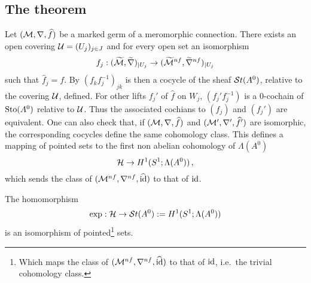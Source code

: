 \subsection{The theorem}
\begin{comment}
  \TODO[See \cite{thboalch} for sheaf-less definition]
\end{comment}
Let $(\mathcal{M},\nabla,\widehat f)$ be a marked germ of a  meromorphic connection.
There exists an open covering $\mathcal{U}=(U_j)_{j\in J}$ and for every open set an
isomorphism
\[
  f_j:(\widetilde{\mathcal{M}},\widetilde\nabla)_{|U_j}
  \to(\widetilde{\mathcal{M}}^{nf},\widetilde\nabla^{nf})_{|U_j}
\]
such that $\hat f_j=f$. By $(f_kf_j^{-1})_{jk}$ is then a cocycle of the
sheaf $\mathcal{S}{}t(A^0)$, relative to the covering $\mathcal{U}$, defined.
For other lifts $f_j'$ of $\hat f$ on $W_j$, $(f_j'f_j^{-1})$ is a $0$-cochain
of $\operatorname{Sto}(A^0)$ relative to $\mathcal{U}$. Thus the associated cochians to $(f_j)$ and
$(f_j')$ are equivalent. One can also check that, if $(\mathcal{M},\nabla,\widehat f)$ and
$(\mathcal{M}',\nabla',\widehat f')$ are isomorphic, the corresponding cocycles define the
same cohomology class. This defines a mapping of pointed sets
to the first non abelian cohomology of $\Lambda(A^0)$
\[
  \mathcal{H}\to H^1(S^1;\Lambda(A^0)) \,,
\]
which sends the class of $(\mathcal{M}^{nf},\nabla^{nf},\widehat{\operatorname{id}})$ to that of
$\operatorname{id}$.

\begin{tthm} \label{thm:mainThm1}
  The homomorphism
  \[
    \exp:\mathcal{H}\to\mathcal{S}{}t(A^0):=H^1(S^1;\Lambda(A^0))
  \]
  is an isomorphism of pointed\footnote{Which maps the class of
  $(\mathcal{M}^{nf},\nabla^{nf},\widehat{\operatorname{id}})$ to that of $\operatorname{id}$, i.e.\ the trivial
  cohomology class.} sets.
\end{tthm}
\begin{comment}
  \begin{rem}
    \marginnote{\cite{Loday1994} Remark I.2.2}
    To another normal form $A^1={}^\Phi\!A^0$ there correspond cochains which
    are conjugated via $\Phi$.
    We get the following commutative diagram:
    \[ \begin{tikzcd}
        G\backslash\hat G(A^1) \rar{\cdot\Phi}\dar{\exp}
        & G\backslash\hat G(A^0) \dar{\exp}
        & \hat F \arrow[|->]{r}\arrow[|->]{d}
        & \hat F\Phi \arrow[|->]{d}
      \\ H^1(S^1;\lambda(A^1)) \rar
        & H^1(S^1;\lambda(A^0))
        & \exp_{\mu_1}(\hat F) \arrow[|->]{r}
        & \exp_{\mu_0}(\hat F\Phi)
    \end{tikzcd} \]
    where $\exp_{\mu_0}(\hat F\Phi)=\Phi^{-1}\exp_{\mu_0}(\hat F)\Phi$.
  \end{rem}
\end{comment}

